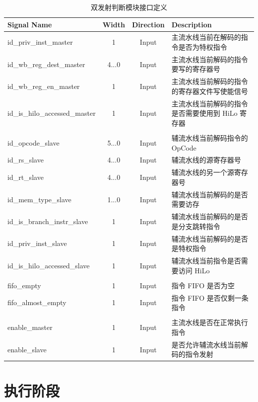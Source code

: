\documentclass[blue,normal,cn,hide]{elegantbook}
\begin{document}
\begin{table}
    \renewcommand\arraystretch{1.25}
    \centering
    \begin{tabular}{lccm{}}
        \toprule 
        \rowcolor{black!20} \textbf{Signal Name} & \textbf{Width} & \textbf{Direction} & \textbf{Description} \\
        \midrule
        id\_priv\_inst\_master & 1 & Input & 主流水线当前在解码的指令是否为特权指令\\
        id\_wb\_reg\_dest\_master & 4...0 & Input & 主流水线当前解码的指令要写的寄存器号\\
        id\_wb\_reg\_en\_master & 1 & Input & 主流水线当前解码的指令的寄存器文件写使能信号\\
        id\_is\_hilo\_accessed\_master & 1 & Input & 主流水线当前解码的指令是否需要使用到 HiLo 寄存器\\
        \\
        id\_opcode\_slave & 5...0 & Input & 辅流水线当前解码指令的 OpCode\\
        id\_rs\_slave & 4...0 & Input & 辅流水线的源寄存器号\\
        id\_rt\_slave & 4...0 & Input & 辅流水线的另一个源寄存器号\\
        id\_mem\_type\_slave & 1...0 & Input & 辅流水线当前解码的是否需要访存\\
        id\_is\_branch\_instr\_slave & 1 & Input & 辅流水线当前解码的是否是分支跳转指令\\
        id\_priv\_inst\_slave & 1 & Input & 辅流水线当前解码的是否是特权指令\\
        id\_is\_hilo\_accessed\_slave & 1 & Input & 辅流水线当前指令是否需要访问 HiLo\\
        \\
        fifo\_empty & 1 & Input & 指令 FIFO 是否为空\\
        fifo\_almost\_empty & 1 & Input & 指令 FIFO 是否仅剩一条指令\\
        \\
        enable\_master & 1 & Input & 主流水线是否在正常执行指令\\
        enable\_slave & 1 & Input & 是否允许辅流水线当前解码的指令发射\\
        \bottomrule
    \end{tabular}
    \caption{双发射判断模块接口定义}
    \label{tab:DualIssueInterface}
\end{table}

\section{执行阶段}
\end{document}
